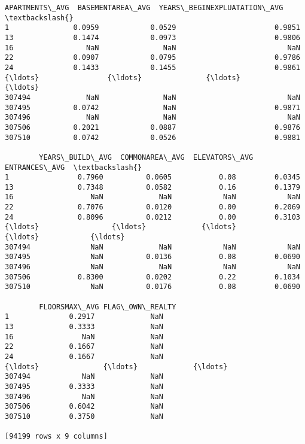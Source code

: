 \documentclass[11pt]{article}
\makeatletter
\newcommand{\boxspacing}{\kern\kvtcb@left@rule\kern\kvtcb@boxsep}
\newcommand{\prompt}[4]{
        {\ttfamily\llap{{\color{#2}[#3]:\hspace{3pt}#4}}\vspace{-\baselineskip}}
    }
\makeatother
\begin{document}
            \begin{tcolorbox}[breakable, size=fbox, boxrule=.5pt, pad at break*=1mm, opacityfill=0]
\prompt{Out}{outcolor}{63}{\boxspacing}
\begin{Verbatim}[commandchars=\\\{\}]
        APARTMENTS\_AVG  BASEMENTAREA\_AVG  YEARS\_BEGINEXPLUATATION\_AVG  \textbackslash{}
1               0.0959            0.0529                       0.9851
13              0.1474            0.0973                       0.9806
16                 NaN               NaN                          NaN
22              0.0907            0.0795                       0.9786
24              0.1433            0.1455                       0.9861
{\ldots}                {\ldots}               {\ldots}                          {\ldots}
307494             NaN               NaN                          NaN
307495          0.0742               NaN                       0.9871
307496             NaN               NaN                          NaN
307506          0.2021            0.0887                       0.9876
307510          0.0742            0.0526                       0.9881

        YEARS\_BUILD\_AVG  COMMONAREA\_AVG  ELEVATORS\_AVG  ENTRANCES\_AVG  \textbackslash{}
1                0.7960          0.0605           0.08         0.0345
13               0.7348          0.0582           0.16         0.1379
16                  NaN             NaN            NaN            NaN
22               0.7076          0.0120           0.00         0.2069
24               0.8096          0.0212           0.00         0.3103
{\ldots}                 {\ldots}             {\ldots}            {\ldots}            {\ldots}
307494              NaN             NaN            NaN            NaN
307495              NaN          0.0136           0.08         0.0690
307496              NaN             NaN            NaN            NaN
307506           0.8300          0.0202           0.22         0.1034
307510              NaN          0.0176           0.08         0.0690

        FLOORSMAX\_AVG FLAG\_OWN\_REALTY
1              0.2917             NaN
13             0.3333             NaN
16                NaN             NaN
22             0.1667             NaN
24             0.1667             NaN
{\ldots}               {\ldots}             {\ldots}
307494            NaN             NaN
307495         0.3333             NaN
307496            NaN             NaN
307506         0.6042             NaN
307510         0.3750             NaN

[94199 rows x 9 columns]
\end{Verbatim}
\end{tcolorbox}
        
\end{document}
